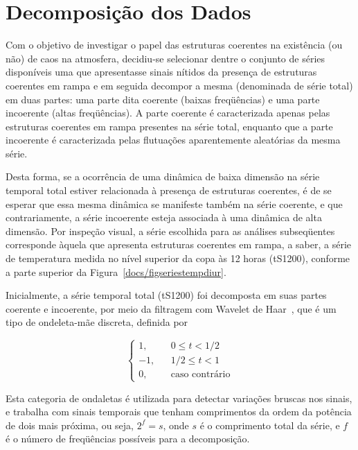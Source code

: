 \section{Decomposição dos Dados}

Com o objetivo de investigar o papel das estruturas coerentes na existência (ou não) de caos na atmosfera, decidiu-se selecionar dentre o conjunto de séries disponíveis uma que apresentasse sinais nítidos da presença de estruturas coerentes em rampa e em seguida decompor a mesma (denominada de série total) em duas partes: uma parte dita coerente (baixas freqüências) e uma parte incoerente (altas freqüências). A parte coerente é caracterizada apenas pelas estruturas coerentes em rampa presentes na série total, enquanto que a parte incoerente é caracterizada pelas flutuações aparentemente aleatórias da mesma série. 

Desta forma, se a ocorrência de uma dinâmica de baixa dimensão na série temporal total estiver relacionada à presença de estruturas coerentes, é de se esperar que essa mesma dinâmica se manifeste também na série coerente, e que contrariamente, a série incoerente esteja associada à uma dinâmica de alta dimensão. Por inspeção visual, a série escolhida para as análises subseqüentes corresponde àquela que apresenta estruturas coerentes em rampa, a saber, a série de temperatura medida no nível superior da copa às 12 horas (tS1200), conforme a parte superior da Figura~\ref{docs/figseriestempdiur}. 


Inicialmente, a série temporal total (tS1200) foi decomposta em suas partes coerente e incoerente, por meio da filtragem com Wavelet de Haar~\cite{katul/94}, que é um tipo de ondeleta-mãe discreta, definida por

\begin{equation}
\left\{ \begin{array}{rrr} 1, &  & 0\leq t < 1/2 \\
                  -1, &  & 1/2\leq t < 1 \\
		   0, &  & \mbox{caso contrário}
\end{array} 
\right.
\label{eqwavelethaar}
\end{equation} 

Esta categoria de ondaletas é utilizada para detectar variações bruscas nos sinais, e trabalha com sinais temporais que tenham comprimentos da ordem da potência de dois mais próxima, ou seja, $2^{f}=s$, onde $s$ é o comprimento total da série, e $f$ é o número de freqüências possíveis para a decomposição. 

